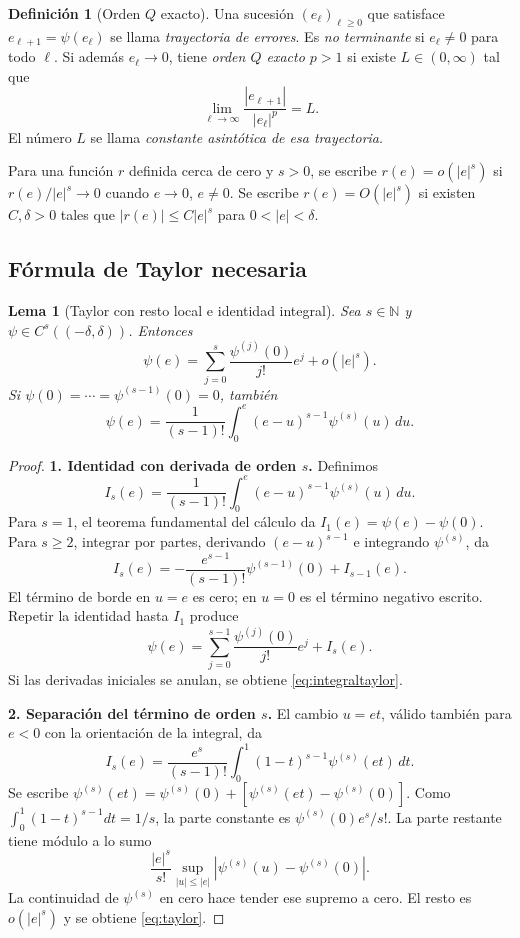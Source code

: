 \documentclass[11pt,a4paper]{article}
\numberwithin{equation}{section}
\newtheorem{lemma}[theorem]{Lema}
\theoremstyle{definition}
\newtheorem{definition}[theorem]{Definición}
\theoremstyle{remark}
\newcommand{\N}{\mathbb N}
\newcommand{\paso}[1]{\par\smallskip\noindent\textbf{#1}\quad}
\begin{document}
\begin{definition}[Orden $Q$ exacto]\label{def:Qorder}
Una sucesión $(e_\ell)_{\ell\ge0}$ que satisface $e_{\ell+1}=\psi(e_\ell)$ se llama \emph{trayectoria de errores}. Es \emph{no terminante} si $e_\ell\ne0$ para todo $\ell$. Si además $e_\ell\to0$, tiene \emph{orden $Q$ exacto $p>1$} si existe $L\in(0,\infty)$ tal que
\[
\lim_{\ell\to\infty}\frac{|e_{\ell+1}|}{|e_\ell|^p}=L.
\]
El número $L$ se llama \emph{constante asintótica de esa trayectoria}.
\end{definition}

Para una función $r$ definida cerca de cero y $s>0$, se escribe $r(e)=o(|e|^s)$ si $r(e)/|e|^s\to0$ cuando $e\to0$, $e\ne0$. Se escribe $r(e)=O(|e|^s)$ si existen $C,\delta>0$ tales que $|r(e)|\le C|e|^s$ para $0<|e|<\delta$.

\subsection{Fórmula de Taylor necesaria}
\begin{lemma}[Taylor con resto local e identidad integral]\label{lem:taylor}
Sea $s\in\N$ y $\psi\in C^s((-\delta,\delta))$. Entonces
\begin{equation}\label{eq:taylor}
\psi(e)=\sum_{j=0}^s\frac{\psi^{(j)}(0)}{j!}e^j+o(|e|^s).
\end{equation}
Si $\psi(0)=\cdots=\psi^{(s-1)}(0)=0$, también
\begin{equation}\label{eq:integraltaylor}
\psi(e)=\frac1{(s-1)!}\int_0^e(e-u)^{s-1}\psi^{(s)}(u)\,du.
\end{equation}
\end{lemma}
\begin{proof}
\paso{1. Identidad con derivada de orden $s$.}
Definimos
\[
I_s(e)=\frac1{(s-1)!}\int_0^e(e-u)^{s-1}\psi^{(s)}(u)\,du.
\]
Para $s=1$, el teorema fundamental del cálculo da $I_1(e)=\psi(e)-\psi(0)$. Para $s\ge2$, integrar por partes, derivando $(e-u)^{s-1}$ e integrando $\psi^{(s)}$, da
\[
I_s(e)=-\frac{e^{s-1}}{(s-1)!}\psi^{(s-1)}(0)+I_{s-1}(e).
\]
El término de borde en $u=e$ es cero; en $u=0$ es el término negativo escrito. Repetir la identidad hasta $I_1$ produce
\[
\psi(e)=\sum_{j=0}^{s-1}\frac{\psi^{(j)}(0)}{j!}e^j+I_s(e).
\]
Si las derivadas iniciales se anulan, se obtiene \eqref{eq:integraltaylor}.

\paso{2. Separación del término de orden $s$.}
El cambio $u=et$, válido también para $e<0$ con la orientación de la integral, da
\[
I_s(e)=\frac{e^s}{(s-1)!}\int_0^1(1-t)^{s-1}\psi^{(s)}(et)\,dt.
\]
Se escribe $\psi^{(s)}(et)=\psi^{(s)}(0)+[\psi^{(s)}(et)-\psi^{(s)}(0)]$. Como $\int_0^1(1-t)^{s-1}dt=1/s$, la parte constante es $\psi^{(s)}(0)e^s/s!$. La parte restante tiene módulo a lo sumo
\[
\frac{|e|^s}{s!}\sup_{|u|\le|e|}|\psi^{(s)}(u)-\psi^{(s)}(0)|.
\]
La continuidad de $\psi^{(s)}$ en cero hace tender ese supremo a cero. El resto es $o(|e|^s)$ y se obtiene \eqref{eq:taylor}.
\end{proof}
\end{document}
